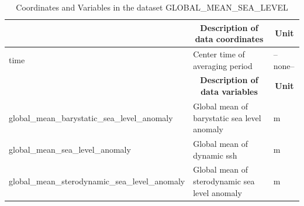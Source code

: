 \begin{longtable}{|m{}|m{}|m{}|}
\caption{Coordinates and Variables in the dataset GLOBAL\_MEAN\_SEA\_LEVEL}
\label{tab:table-<xarray.Dataset> Size: 228kB
Dimensions:                                     (time: 9497)
Coordinates:
  * time                                        (time) datetime64[ns] 76kB 19...
Data variables:
    global_mean_barystatic_sea_level_anomaly    (time) float32 38kB ...
    global_mean_sea_level_anomaly               (time) float32 38kB ...
    global_mean_sterodynamic_sea_level_anomaly  (time) float64 76kB ...
Attributes: (12/48)
    acknowledgement:              This research was carried out by the Jet Pr...
    author:                       Ian Fenty and Ou Wang
    cdm_data_type:                Grid
    comment:                      1D time series calculated from fields on th...
    Conventions:                  CF-1.8, ACDD-1.3
    coordinates_comment:          Note: the global 'coordinates' attribute de...
    ...                           ...
    time_coverage_duration:       P1D
    time_coverage_end:            2017-12-31T12:00:00
    time_coverage_resolution:     P1D
    time_coverage_start:          1992-01-01T12:00:00
    title:                        ECCO Global Mean Sea Level - Daily Mean (Ve...
    uuid:                         93ffdb44-86d8-11eb-a688-f8f21e2ee3e0-fields} \\ 
\hline \endhead \hline \endfoot
\rowcolor{lightgray} \multicolumn{1}{|c|}{\textbf{Coordinates}} & \multicolumn{1}{|c|}{\textbf{Description of data coordinates}} &  \multicolumn{1}{|c|}{\textbf{Unit}}\\ \hline
time &Center time of averaging period &--none--  \\ \hline
\rowcolor{lightgray} \multicolumn{1}{|c|}{\textbf{Variables}} & \multicolumn{1}{|c|}{\textbf{Description of data variables}} &  \multicolumn{1}{|c|}{\textbf{Unit}}\\ \hline
global\_mean\_barystatic\_sea\_level\_anomaly &Global mean of barystatic sea level anomaly &m  \\ \hline
global\_mean\_sea\_level\_anomaly &Global mean of dynamic ssh &m  \\ \hline
global\_mean\_sterodynamic\_sea\_level\_anomaly &Global mean of sterodynamic sea level anomaly &m  \\ \hline
\end{longtable}

\newp
\pagebreak
